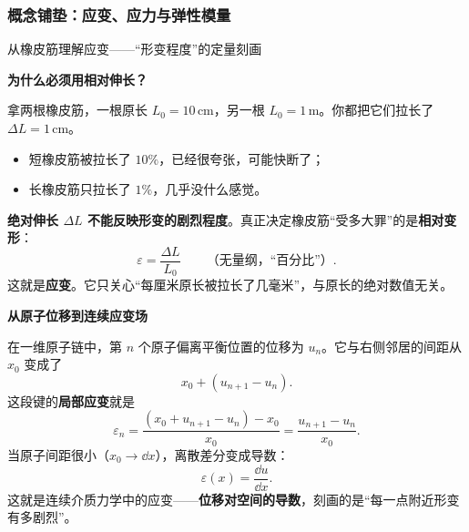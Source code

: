 \subsubsection*{概念铺垫：应变、应力与弹性模量}

\begin{insightbox}{从橡皮筋理解应变——``形变程度''的定量刻画}

\textbf{为什么必须用相对伸长？}

拿两根橡皮筋，一根原长 $L_0 = 10\,\text{cm}$，另一根 $L_0 = 1\,\text{m}$。你都把它们拉长了 $\Delta L = 1\,\text{cm}$。
\begin{itemize}[nosep]
  \item 短橡皮筋被拉长了 $10\%$，已经很夸张，可能快断了；
  \item 长橡皮筋只拉长了 $1\%$，几乎没什么感觉。
\end{itemize}
\textbf{绝对伸长 $\Delta L$ 不能反映形变的剧烈程度}。真正决定橡皮筋``受多大罪''的是\textbf{相对变形}：
\[
  \boxed{ \varepsilon = \frac{\Delta L}{L_0} } \qquad \text{（无量纲，``百分比''）}.
\]
这就是\textbf{应变}。它只关心``每厘米原长被拉长了几毫米''，与原长的绝对数值无关。

\textbf{从原子位移到连续应变场}

在一维原子链中，第 $n$ 个原子偏离平衡位置的位移为 $u_n$。它与右侧邻居的间距从 $x_0$ 变成了
\[
  x_0 + (u_{n+1} - u_n).
\]
这段键的\textbf{局部应变}就是
\[
  \varepsilon_n = \frac{(x_0 + u_{n+1} - u_n) - x_0}{x_0} = \frac{u_{n+1} - u_n}{x_0}.
\]
当原子间距很小（$x_0 \to \dd x$），离散差分变成导数：
\[
  \varepsilon(x) = \frac{\dd u}{\dd x}.
\]
这就是连续介质力学中的应变——\textbf{位移对空间的导数}，刻画的是``每一点附近形变有多剧烈''。
\end{insightbox}

